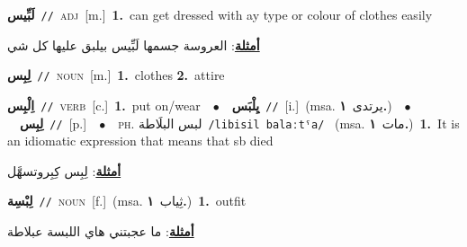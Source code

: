 \documentclass[10pt,a4paper,twoside]{article} %
\begin{document}
\begin{multicols}{2}
{{{{{{{{\setlength\topsep{0pt}\textbf{\foreignlanguage{arabic}{لَبِّيس}}\ {\color{gray}\texttt{//}\color{black}}\ \textsc{adj}\ [m.]\ \textbf{1.}~can get dressed with ay type or colour of clothes easily\  \begin{flushright}\color{gray}\foreignlanguage{arabic}{\textbf{\underline{\foreignlanguage{arabic}{أمثلة}}}: العروسة جسمها لَبِّيس بيلبق عليها كل شي}\end{flushright}\color{black}} \vspace{2mm}

{\setlength\topsep{0pt}\textbf{\foreignlanguage{arabic}{لِبِس}}\ {\color{gray}\texttt{//}\color{black}}\ \textsc{noun}\ [m.]\ \textbf{1.}~clothes  \textbf{2.}~attire\ 

{\setlength\topsep{0pt}\textbf{\foreignlanguage{arabic}{اِلْبِس}}\ {\color{gray}\texttt{//}\color{black}}\ \textsc{verb}\ [c.]\ \textbf{1.}~put on/wear\ \ $\bullet$\ \ \setlength\topsep{0pt}\textbf{\foreignlanguage{arabic}{يِلْبَس}}\ {\color{gray}\texttt{//}\color{black}}\ [i.]\ \color{gray}(msa. \foreignlanguage{arabic}{يرتدى}~\foreignlanguage{arabic}{\textbf{١.}})\color{black}\ \ $\bullet$\ \ \setlength\topsep{0pt}\textbf{\foreignlanguage{arabic}{لِبِس}}\ {\color{gray}\texttt{//}\color{black}}\ [p.]\ \ $\bullet$\ \ \textsc{ph.} \color{gray} \foreignlanguage{arabic}{لبس البلَاطة}\color{black}\ {\color{gray}\texttt{/{\sffamily libisil balaːtˤa}/}\color{black}}\ \color{gray} (msa. \foreignlanguage{arabic}{مات}~\foreignlanguage{arabic}{\textbf{١.}})\color{black}\ \textbf{1.}~It is an idiomatic expression that means that sb died\  \begin{flushright}\color{gray}\foreignlanguage{arabic}{\textbf{\underline{\foreignlanguage{arabic}{أمثلة}}}: لِبِس كِبِروتسهَّل}\end{flushright}\color{black}} \vspace{2mm}

{\setlength\topsep{0pt}\textbf{\foreignlanguage{arabic}{لِبْسِة}}\ {\color{gray}\texttt{//}\color{black}}\ \textsc{noun}\ [f.]\ \color{gray}(msa. \foreignlanguage{arabic}{ثِياب}~\foreignlanguage{arabic}{\textbf{١.}})\color{black}\ \textbf{1.}~outfit\  \begin{flushright}\color{gray}\foreignlanguage{arabic}{\textbf{\underline{\foreignlanguage{arabic}{أمثلة}}}: ما عجبتني هاي اللبسة عبلاطة}\end{flushright}\color{black}} \vspace{2mm}

}}}}}}}}
\end{multicols}
\end{document}

